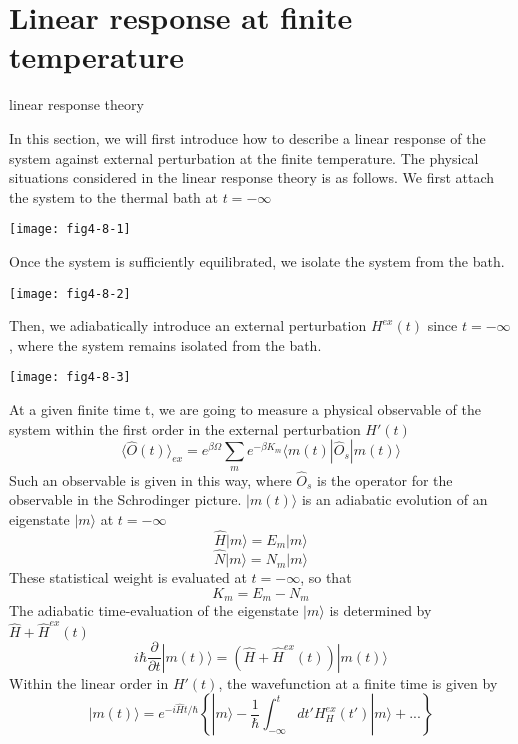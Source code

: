 \section{Linear response at finite temperature}
\begin{center}
linear response theory
\end{center}
 In this section, we will first introduce how to describe a linear response of the system against external perturbation at the finite temperature.
 The physical situations considered in the linear response theory is as follows.
 We first attach the system to the thermal bath at $t=-\infty$
\begin{center}
\texttt{[image: fig4-8-1]}
\end{center}
 Once the system is sufficiently equilibrated, we isolate the system from the bath.
\begin{center}
\texttt{[image: fig4-8-2]}
\end{center}
 Then, we adiabatically introduce an external perturbation $H^{ex}(t)$ since $t=-\infty$, where the system remains isolated from the bath.
\begin{center}
\texttt{[image: fig4-8-3]}
\end{center}
 At a given finite time t, we are going to measure a physical observable of the system within the first order in the external perturbation $H'(t)$
\begin{equation}\label{eq4.8.1}
\langle \hat O(t)\rangle_{ex}=e^{\beta\Omega} \sum_m e^{-\beta K_m} \langle m(t)|\hat O _s|m(t)\rangle
\end{equation}
 Such an observable is given in this way, where $\hat O_s$ is the operator for the observable in the Schrodinger picture.
 $|m(t)\rangle$ is an adiabatic evolution of an eigenstate $|m\rangle$ at $t=-\infty$
\[
\hat H |m\rangle=E_m|m\rangle
\]
\[
\hat N |m\rangle=N_m|m\rangle
\]
 These statistical weight is evaluated at $t=-\infty$, so that 
\[
K_m=E_m-N_m
\]
 The adiabatic time-evaluation of the eigenstate $| m\rangle$ is determined by $\hat H+\hat H^{ex}(t)$
\begin{equation}
i\hbar \frac{\partial}{\partial t}|m(t)\rangle=(\hat H+\hat H^{ex}(t))|m(t)\rangle
\end{equation}
 Within the linear order in $H'(t)$, the wavefunction at a finite time is given by
\begin{equation}
|m(t)\rangle=e^{-i\hat H t/\hbar}\left\{ |m\rangle -\frac{1}{\hbar} \int _{-\infty}^t dt' H_H^{ex}(t') |m\rangle+... \right\}
\end{equation}
